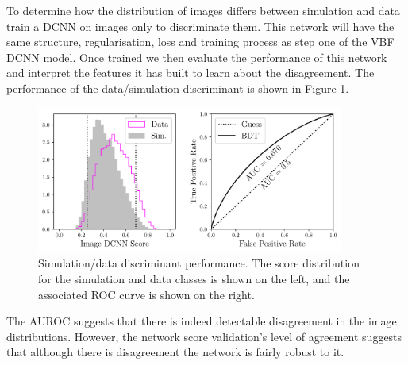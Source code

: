 To determine how the distribution of images differs between simulation and data train a DCNN on images only to discriminate them. 
This network will have the same structure, regularisation, loss and training process as step one of the VBF DCNN model. 
Once trained we then evaluate the performance of this network and interpret the features it has built to learn about the disagreement.  
The performance of the data/simulation discriminant is shown in Figure \ref{fig:event_categorisation:zee_disc_perf}.
\begin{figure}[h!]
    \centering
    \includegraphics[width=0.9\textwidth]{figures/event_selection/ROC_Zee_img_DCNN.pdf}
    \caption{\Zee Simulation/data discriminant performance. The score distribution for the simulation and data classes is shown on the left, and the associated ROC curve is shown on the right.} 
    \label{fig:event_categorisation:zee_disc_perf}
\end{figure}

The AUROC suggests that there is indeed detectable disagreement in the image distributions. 
However, the network score validation's level of agreement suggests that although there is disagreement the network is fairly robust to it. 


